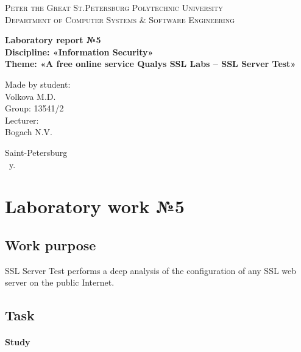 \documentclass[14pt,a4paper,report]{report}
\begin{document}
\def\contentsname{Contents}

\begin{titlepage}
	\begin{center}
		\textsc{Peter the Great St.Petersburg Polytechnic University\\[5mm]
			Department of Computer Systems \& Software Engineering}
		
		\vfill
		
		\textbf{Laboratory report №5\\[3mm]
			Discipline: «Information Security»\\[3mm]
			Theme: «A free online service Qualys SSL Labs -- SSL Server Test»\\[41mm]
		}
	\end{center}
	
	\hfill
	\begin{minipage}{.4\textwidth}
		Made by student:\\[2mm] 
		Volkova M.D.\\
		Group: 13541/2\\[5mm]
		
		Lecturer:\\[2mm] 
		Bogach N.V.
	\end{minipage}
	\vfill
	\begin{center}
		Saint-Petersburg\\ \the\year\ y.
	\end{center}
\end{titlepage}

\tableofcontents
\clearpage

\chapter{Laboratory work №5}

\section{Work purpose}

SSL Server Test performs a deep analysis of the configuration of any SSL web server on the public Internet.

\section{Task}

\subsubsection{Study}
\end{document}
